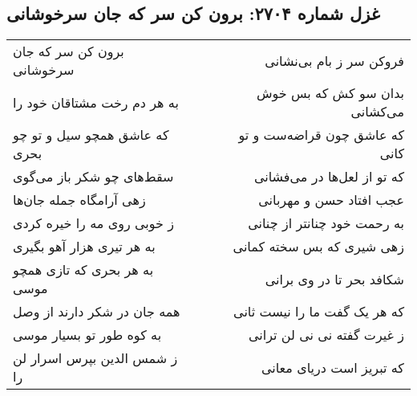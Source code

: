 \begin{center}
\section*{غزل شماره ۲۷۰۴: برون کن سر که جان سرخوشانی}
\label{sec:2704}
\begin{longtable}{l p{0.5cm} r}
برون کن سر که جان سرخوشانی
&&
فروکن سر ز بام بی‌نشانی
\\
به هر دم رخت مشتاقان خود را
&&
بدان سو کش که بس خوش می‌کشانی
\\
که عاشق همچو سیل و تو چو بحری
&&
که عاشق چون قراضه‌ست و تو کانی
\\
سقط‌های چو شکر باز می‌گوی
&&
که تو از لعل‌ها در می‌فشانی
\\
زهی آرامگاه جمله جان‌ها
&&
عجب افتاد حسن و مهربانی
\\
ز خوبی روی مه را خیره کردی
&&
به رحمت خود چنانتر از چنانی
\\
به هر تیری هزار آهو بگیری
&&
زهی شیری که بس سخته کمانی
\\
به هر بحری که تازی همچو موسی
&&
شکافد بحر تا در وی برانی
\\
همه جان در شکر دارند از وصل
&&
که هر یک گفت ما را نیست ثانی
\\
به کوه طور تو بسیار موسی
&&
ز غیرت گفته نی نی لن ترانی
\\
ز شمس الدین بپرس اسرار لن را
&&
که تبریز است دریای معانی
\\
\end{longtable}
\end{center}
